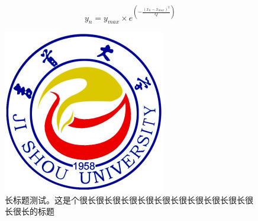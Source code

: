 \documentclass{imutthesis}
\begin{document}
\begin{equation}
				y_{n}=y_{max} \times e^{\left (-\frac{(x_{n}-x_{max})^{2}}{Q} \right )}
\end{equation}


\begin{figure}[H]
	\centering
	\includegraphics[scale=0.8]{figures/JSU1958.jpg}
	\caption{长标题测试。这是个很长很长很长很长很长很长很长很长很长很长很长很长的标题}
\end{figure}

\begin{table}[H]
	\centering
	\caption{跑马灯I/O分配表}
\end{table}
\end{document}
